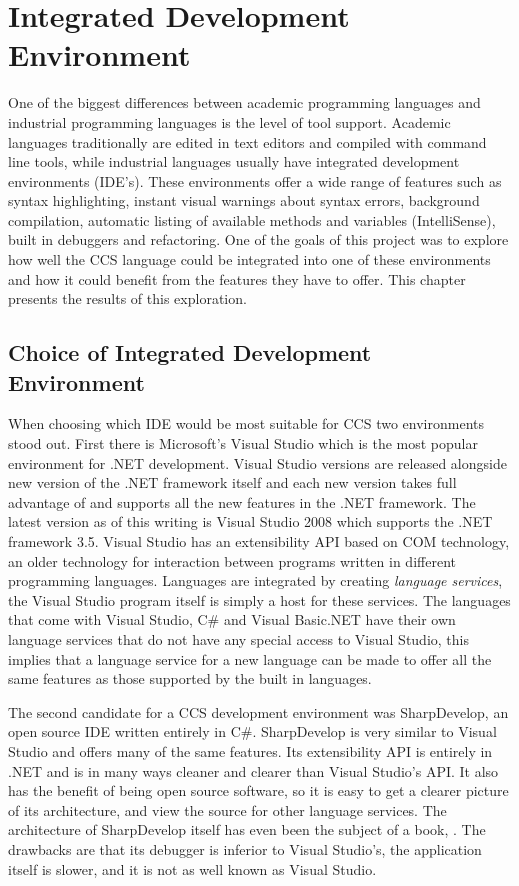 \chapter{Integrated Development Environment}

	One of the biggest differences between academic programming languages and 
	industrial programming languages is the level of tool support. Academic 
	languages traditionally are edited in text editors and compiled with command 
	line tools, while industrial languages usually have integrated development 
	environments (IDE's). These environments offer a wide range of features such 
	as syntax highlighting, instant visual warnings about syntax errors, 
	background compilation, automatic listing of available methods and variables 
	(IntelliSense), built in debuggers and refactoring. One of the goals of this 
	project was to explore how well the CCS language could be integrated into 
	one of these environments and how it could benefit from the features they 
	have to offer. This chapter presents the results of this exploration. 
	
\section{Choice of Integrated Development Environment}
	
	When choosing which IDE would be most suitable for CCS two environments 
	stood out. First there is Microsoft's Visual Studio which is the most 
	popular environment for .NET development. Visual Studio versions are 
	released alongside new version of the .NET framework itself and each new 
	version takes full advantage of and supports all the new features in the 
	.NET framework. The latest version as of this writing is Visual Studio 2008 
	which supports the .NET framework 3.5. Visual Studio has an extensibility 
	API based on COM technology, an older technology for interaction between 
	programs written in different programming languages. Languages are 
	integrated by creating \textit{language services}, the Visual Studio program 
	itself is simply a host for these services. The languages that come with 
	Visual Studio, C\# and Visual Basic.NET have their own language services 
	that do not have any special access to Visual Studio, this implies that a 
	language service for a new language can be made to offer all the same 
	features as those supported by the built in languages.
	
	The second candidate for a CCS development environment was SharpDevelop, an 
	open source IDE written entirely in C\#. SharpDevelop is very similar to 
	Visual Studio and offers many of the same features. Its extensibility API is 
	entirely in .NET and is in many ways cleaner and clearer than Visual 
	Studio's API. It also has the benefit of being open source software, so it 
	is easy to get a clearer picture of its architecture, and view the source 
	for other language services. The architecture of SharpDevelop itself has 
	even been the subject of a book, \cite{sharpdevelop}. The drawbacks
	are that its debugger is inferior to Visual Studio's, the application itself
	is slower, and it is not as well known as Visual Studio.
	
